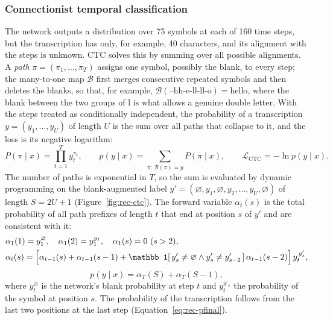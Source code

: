 \subsubsection{Connectionist temporal classification}

The network outputs a distribution over 75 symbols at each of 160 time steps, but the transcription has only, for example, 40 characters, and its alignment with the steps is unknown.
CTC solves this by summing over all possible alignments.
A \emph{path} $\pi=(\pi_1,\ldots,\pi_T)$ assigns one symbol, possibly the blank, to every step; the many-to-one map $\mathcal B$ first merges consecutive repeated symbols and then deletes the blanks, so that, for example, $\mathcal B(\text{--hh-e-ll-ll-o})=\text{hello}$, where the blank between the two groups of l is what allows a genuine double letter.
With the steps treated as conditionally independent, the probability of a transcription $y=(y_1,\ldots,y_U)$ of length $U$ is the sum over all paths that collapse to it, and the loss is its negative logarithm:
\begin{equation}
P(\pi\mid x)=\prod_{t=1}^{T}y_t^{\pi_t},\qquad p(y\mid x)=\sum_{\pi:\,\mathcal B(\pi)=y}P(\pi\mid x),\qquad \mathcal L_{\mathrm{CTC}}=-\ln p(y\mid x).
\label{eq:rec-ctcprob}
\end{equation}
The number of paths is exponential in $T$, so the sum is evaluated by dynamic programming on the blank-augmented label $y'=(\varnothing,y_1,\varnothing,y_2,\ldots,y_U,\varnothing)$ of length $S=2U+1$ (Figure~\ref{fig:rec-ctc}).
The forward variable $\alpha_t(s)$ is the total probability of all path prefixes of length $t$ that end at position $s$ of $y'$ and are consistent with it:
\begin{equation}
\begin{split}&\alpha_1(1)=y_1^{\varnothing},\quad\alpha_1(2)=y_1^{y_1},\quad\alpha_1(s)=0\ (s>2),\\&\alpha_t(s)=\Bigl[\alpha_{t-1}(s)+\alpha_{t-1}(s-1)+\mathbb 1[\,y'_s\ne\varnothing\wedge y'_s\ne y'_{s-2}\,]\,\alpha_{t-1}(s-2)\Bigr]\,y_t^{\,y'_s},\end{split}
\label{eq:rec-alpha}
\end{equation}
\begin{equation}
p(y\mid x)=\alpha_T(S)+\alpha_T(S-1),
\label{eq:rec-pfinal}
\end{equation}
where $y_t^{\varnothing}$ is the network's blank probability at step $t$ and $y_t^{y'_s}$ the probability of the symbol at position $s$.
The probability of the transcription follows from the last two positions at the last step (Equation~\ref{eq:rec-pfinal}).
